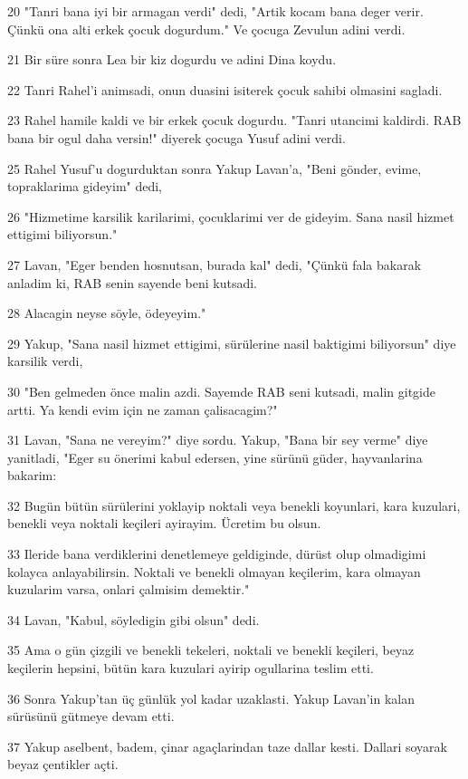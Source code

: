 \par 20 "Tanri bana iyi bir armagan verdi" dedi, "Artik kocam bana deger verir. Çünkü ona alti erkek çocuk dogurdum." Ve çocuga Zevulun adini verdi.
\par 21 Bir süre sonra Lea bir kiz dogurdu ve adini Dina koydu.
\par 22 Tanri Rahel'i animsadi, onun duasini isiterek çocuk sahibi olmasini sagladi.
\par 23 Rahel hamile kaldi ve bir erkek çocuk dogurdu. "Tanri utancimi kaldirdi. RAB bana bir ogul daha versin!" diyerek çocuga Yusuf adini verdi.
\par 25 Rahel Yusuf'u dogurduktan sonra Yakup Lavan'a, "Beni gönder, evime, topraklarima gideyim" dedi,
\par 26 "Hizmetime karsilik karilarimi, çocuklarimi ver de gideyim. Sana nasil hizmet ettigimi biliyorsun."
\par 27 Lavan, "Eger benden hosnutsan, burada kal" dedi, "Çünkü fala bakarak anladim ki, RAB senin sayende beni kutsadi.
\par 28 Alacagin neyse söyle, ödeyeyim."
\par 29 Yakup, "Sana nasil hizmet ettigimi, sürülerine nasil baktigimi biliyorsun" diye karsilik verdi,
\par 30 "Ben gelmeden önce malin azdi. Sayemde RAB seni kutsadi, malin gitgide artti. Ya kendi evim için ne zaman çalisacagim?"
\par 31 Lavan, "Sana ne vereyim?" diye sordu. Yakup, "Bana bir sey verme" diye yanitladi, "Eger su önerimi kabul edersen, yine sürünü güder, hayvanlarina bakarim:
\par 32 Bugün bütün sürülerini yoklayip noktali veya benekli koyunlari, kara kuzulari, benekli veya noktali keçileri ayirayim. Ücretim bu olsun.
\par 33 Ileride bana verdiklerini denetlemeye geldiginde, dürüst olup olmadigimi kolayca anlayabilirsin. Noktali ve benekli olmayan keçilerim, kara olmayan kuzularim varsa, onlari çalmisim demektir."
\par 34 Lavan, "Kabul, söyledigin gibi olsun" dedi.
\par 35 Ama o gün çizgili ve benekli tekeleri, noktali ve benekli keçileri, beyaz keçilerin hepsini, bütün kara kuzulari ayirip ogullarina teslim etti.
\par 36 Sonra Yakup'tan üç günlük yol kadar uzaklasti. Yakup Lavan'in kalan sürüsünü gütmeye devam etti.
\par 37 Yakup aselbent, badem, çinar agaçlarindan taze dallar kesti. Dallari soyarak beyaz çentikler açti.

